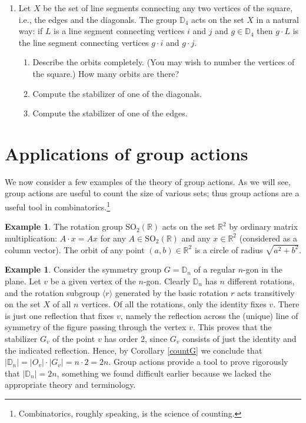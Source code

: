 \documentclass[11pt,oneside]{article}
\newenvironment{problems}
{
 \begin{enumerate}[topsep=1pt,itemsep=0pt,parsep=2pt,leftmargin=0.6cm,%
 label={\arabic*.}, ref=\arabic*] \small
}
{
 \end{enumerate}
}
\theoremstyle{definition}
\newtheorem{example}[thm]{Example}
\newcommand{\R}{\mathbb{R}} %
\newcommand{\gen}[1]{\langle #1 \rangle}
\newcommand{\SO}{\mathrm{SO}}
\newcommand{\D}{\mathbb{D}}
\begin{document}
\begin{problems}
\item Let $X$ be the set of line segments connecting any two vertices
  of the square, i.e., the edges and the diagonals. The group $\D_4$
  acts on the set $X$ in a natural way: if $L$ is a line segment
  connecting vertices $i$ and $j$ and $g \in \D_4$ then $g\cdot L$ is
  the line segment connecting vertices $g\cdot i$ and $g \cdot j$. 
  \begin{enumerate}
  \item Describe the orbits completely. (You may wish to number the
    vertices of the square.) How many orbits are there?
  \item Compute the stabilizer of one of the diagonals.
  \item Compute the stabilizer of one of the edges.
  \end{enumerate}

\end{problems}



\newpage
\section{Applications of group actions}\noindent
We now consider a few examples of the theory of group actions. As we
will see, group actions are useful to count the size of various sets;
thus group actions are a useful tool in
combinatorics.\footnote{Combinatorics, roughly
  speaking, is the science of counting.}

\begin{example}
The rotation group $\SO_2(\R)$ acts on the set $\R^2$ by ordinary
matrix multiplication: $A\cdot x = Ax$ for any $A \in \SO_2(\R)$ and
any $x \in \R^2$ (considered as a column vector).  The orbit of any
point $(a,b) \in \R^2$ is a circle of radius $\sqrt{a^2+b^2}$.
\end{example}


\begin{example}
Consider the symmetry group $G=\D_n$ of a regular $n$-gon in the
plane. Let $v$ be a given vertex of the $n$-gon. Clearly $\D_n$ has
$n$ different rotations, and the rotation subgroup $\gen{r}$ generated
by the basic rotation $r$ acts transitively on the set $X$ of all $n$
vertices.  Of all the rotations, only the identity fixes $v$. There is
just one reflection that fixes $v$, namely the reflection across the
(unique) line of symmetry of the figure passing through the vertex
$v$. This proves that the stabilizer $G_v$ of the point $v$ has order
2, since $G_v$ consists of just the identity and the indicated
reflection. Hence, by Corollary \ref{countG} we conclude that $|\D_n|
= |O_v|\cdot |G_v| = n\cdot 2 = 2n$.  Group actions provide a tool to
prove rigorously that $|\D_n|=2n$, something we found difficult
earlier because we lacked the appropriate theory and terminology.
\end{example}
\end{document}
